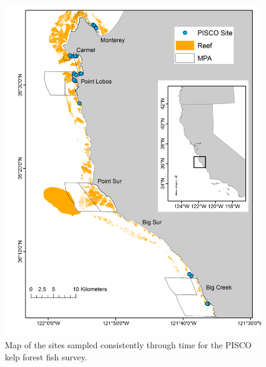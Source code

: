 \documentclass[12pt,]{article}
\begin{document}
\begin{figure}
\centering
\includegraphics{Figures/PISCO_sites.png}
\caption{Map of the sites sampled consistently through time for the
PISCO kelp forest fish survey. \label{fig:PISCO_sites}}
\end{figure}

\FloatBarrier
\end{document}
